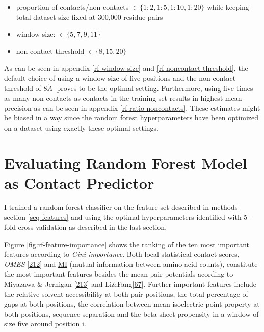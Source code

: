 \documentclass[11pt,a4paper,twoside]{book}
\providecommand{\tightlist}{%
  \setlength{\itemsep}{0pt}\setlength{\parskip}{0pt}}
\newcommand{\angstrom}{\mathring{A} \;}
\theoremstyle{definition}
\theoremstyle{definition}
\theoremstyle{remark}
\begin{document}
\begin{itemize}
\tightlist
\item
  proportion of contacts/non-contacts
  \(\in \{1\!:\!2, 1\!:\!5, 1\!:\!10, 1\!:\!20 \}\) while keeping total
  dataset size fixed at 300,000 residue pairs
\item
  window size: \(\in \{5, 7, 9, 11\}\)
\item
  non-contact threshold \(\in \{8, 15, 20\}\)
\end{itemize}

As can be seen in appendix \ref{rf-window-size} and
\ref{rf-noncontact-threshold}, the default choice of using a window size
of five positions and the non-contact threshold of \(8 \angstrom\)
proves to be the optimal setting. Furthermore, using five-times as many
non-contacts as contacts in the training set results in highest mean
precision as can be seen in appendix \ref{rf-ratio-noncontacts}. These
estimates might be biased in a way since the random forest
hyperparameters have been optimized on a dataset using exactly these
optimal settings.

\section{Evaluating Random Forest Model as Contact
Predictor}\label{evaluating-random-forest-model-as-contact-predictor}

I trained a random forest classifier on the feature set described in
methods section \ref{seq-features} and using the optimal hyperparameters
identified with 5-fold cross-validation as described in the last
section.

Figure \ref{fig:rf-feature-importance} shows the ranking of the ten most
important features according to \emph{Gini importance}. Both local
statistical contact scores, \emph{OMES}
{[}\protect\hyperlink{ref-Fodor2004a}{212}{]} and
\protect\hyperlink{abbrev}{MI} (mutual information between amino acid
counts), constitute the most important features besides the mean pair
potentials acording to Miyazawa \& Jernigan
{[}\protect\hyperlink{ref-Miyazawa1999a}{213}{]} and
Li\&Fang{[}\protect\hyperlink{ref-Li2011}{67}{]}. Further important
features include the relative solvent accessibility at both pair
positions, the total percentage of gaps at both positions, the
correlation between mean isoelectric point property at both positions,
sequence separation and the beta-sheet propensity in a window of size
five around position i.
\end{document}
